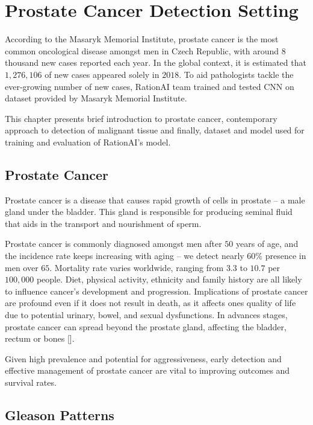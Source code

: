 \chapter{Prostate Cancer Detection Setting}

According to the Masaryk Memorial Institute, prostate cancer is the most common oncological disease amongst men in Czech Republic, with around $8$ thousand new cases reported each year. In the global context, it is estimated that $1,276,106$ of new cases appeared solely in $2018$. To aid pathologists tackle the ever-growing number of new cases, RationAI team trained and tested CNN on dataset provided by Masaryk Memorial Institute.

This chapter presents brief introduction to prostate cancer, contemporary approach to detection of malignant tissue and finally, dataset and model used for training and evaluation of RationAI's model.

\section{Prostate Cancer}

Prostate cancer is a disease that causes rapid growth of cells in prostate -- a male gland under the bladder. This gland is responsible for producing seminal fluid that aids in the transport and nourishment of sperm.


Prostate cancer is commonly diagnosed amongst men after $50$ years of age, and the incidence rate keeps increasing with aging -- we detect nearly $60$\% presence in men over $65$. Mortality rate varies worldwide, ranging from $3.3$ to $10.7$ per $100,000$ people. Diet, physical activity, ethnicity and family history are all likely to influence cancer's development and progression. Implications of prostate cancer are profound even if it does not result in death, as it affects ones quality of life due to potential urinary, bowel, and sexual dysfunctions. In advances stages, prostate cancer can spread beyond the prostate gland, affecting the bladder, rectum or bones [].

Given high prevalence and potential for aggressiveness, early detection and effective management of prostate cancer are vital to improving outcomes and survival rates.

\section{Gleason Patterns}

